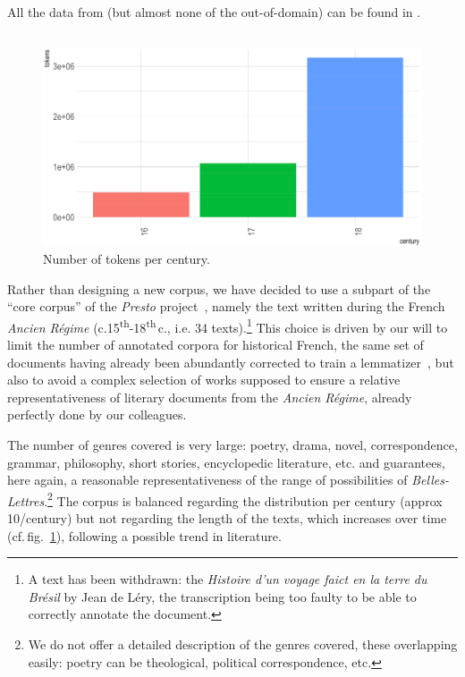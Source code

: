 All the data from \freemlpm (but almost none of the out-of-domain) can be found in \freemmax.

\subsection{\texorpdfstring{\freemner}{FREEM NER}}\label{freem_ner}

\begin{figure}[!ht]
    \centering
    \includegraphics[width=0.6\linewidth]{static/media/mod_eval/dalembert/distribution_tokens_corpus.png}
    \caption{Number of tokens per century.}
    \label{fig:description}
\end{figure}

Rather than designing a new corpus, we have decided to use a subpart of the ``core corpus'' of the \textit{Presto} project~\citep{blumenthal-etal-2017-presto}, namely the text written during the French \textit{Ancien Régime} (c.15\textsuperscript{th}-18\textsuperscript{th}\,c., i.e. 34 texts).\footnote{A text has been withdrawn: the \textit{Histoire d'un voyage faict en la terre du Brésil} by Jean de Léry, the transcription being too faulty to be able to correctly annotate the document.} This choice is driven by our will to limit the number of annotated corpora for historical French, the same set of documents having already been abundantly corrected to train a lemmatizer~\citep{gabay-etal-2020-standardizing}, but also to avoid a complex selection of works supposed to ensure a relative representativeness of literary documents from the \textit{Ancien Régime}, already perfectly done by our colleagues.

The number of genres covered is very large: poetry, drama, novel, correspondence, grammar, philosophy, short stories, encyclopedic literature, etc. and guarantees, here again, a reasonable representativeness of the range of possibilities of \textit{Belles-Lettres}.\footnote{We do not offer a detailed description of the genres covered, these overlapping easily: poetry can be theological, political correspondence, etc.} The corpus is balanced regarding the distribution per century (approx\,10/century) but not regarding the length of the texts, which increases over time (cf.\,fig.~\ref{fig:description}), following a possible trend in literature.

